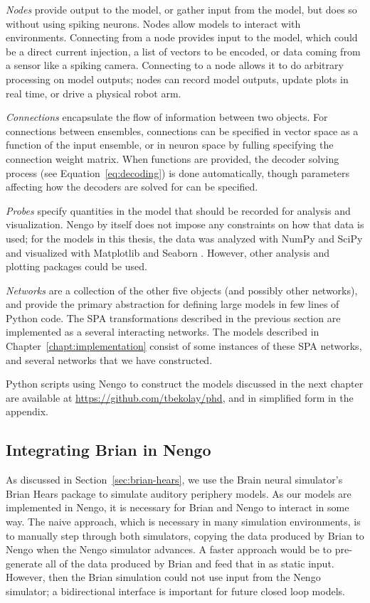 {{\textit{Nodes} provide output
to the model, or gather input from the model,
but does so without using spiking neurons.
Nodes allow models to interact with environments.
Connecting from a node provides input
to the model, which could be
a direct current injection,
a list of vectors to be encoded,
or data coming from a sensor
like a spiking camera.
Connecting to a node allows it
to do arbitrary processing on
model outputs;
nodes can record model outputs,
update plots in real time,
or drive a physical robot arm.

\textit{Connections} encapsulate
the flow of information between two objects.
For connections between ensembles,
connections can be specified in vector space
as a function of the input ensemble,
or in neuron space
by fulling specifying the connection weight matrix.
When functions are provided,
the decoder solving process
(see Equation~\eqref{eq:decoding})
is done automatically,
though parameters affecting
how the decoders are solved for
can be specified.

\textit{Probes} specify quantities
in the model that should be recorded
for analysis and visualization.
Nengo by itself does not
impose any constraints on how
that data is used;
for the models in this thesis,
the data was analyzed with
NumPy \cite{vanderwalt2011}
and SciPy \cite{jones2014}
and visualized with
Matplotlib \cite{hunter2007}
and Seaborn \cite{waskom2014}.
However, other analysis and plotting packages
could be used.

\textit{Networks} are a collection of
the other five objects
(and possibly other networks),
and provide the primary abstraction
for defining large models
in few lines of Python code.
The SPA transformations
described in the previous section
are implemented as a several
interacting networks.
The models described
in Chapter~\ref{chapt:implementation} consist
of some instances of
these SPA networks,
and several networks
that we have constructed.

Python scripts using Nengo to construct
the models discussed in the next chapter
are available at \url{https://github.com/tbekolay/phd},
and in simplified form in the appendix.

\subsection{Integrating Brian in Nengo}

As discussed in Section~\ref{sec:brian-hears},
we use the Brain neural simulator's
Brian Hears package
to simulate auditory periphery models.
As our models are implemented in Nengo,
it is necessary for Brian and Nengo
to interact in some way.
The naive approach,
which is necessary in many simulation environments,
is to manually step through both simulators,
copying the data produced by Brian
to Nengo when the Nengo simulator advances.
A faster approach would be to
pre-generate all of the data
produced by Brian
and feed that in as
static input.
However,
then the Brian simulation could not
use input from the Nengo simulator;
a bidirectional interface
is important for future closed loop models.

}}

